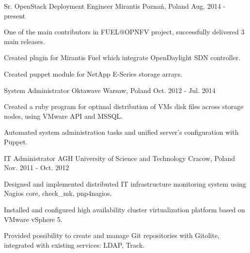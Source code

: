 

\begin{cventries}

  \cventry
    {Sr. OpenStack Deployment Engineer} %
    {Mirantis} %
    {Poznań, Poland} %
    {Aug. 2014 - present} %
    {
      \begin{cvitems} %
        \item {One of the main contributors in FUEL@OPNFV project, successfully delivered 3 main releases.}
        \item {Created plugin for Mirantis Fuel which integrate OpenDaylight SDN controller.}
        \item {Created puppet module for NetApp E-Series storage arrays.}
      \end{cvitems}
    }

  \cventry
    {System Administrator} %
    {Oktawave} %
    {Warsaw, Poland} %
    {Oct. 2012 - Jul. 2014} %
    {
      \begin{cvitems} %
        \item {Created a ruby program for optimal distribution of VMs disk files across storage nodes, using VMware API and MSSQL.}
        \item {Automated system administration tasks and unified server's configuration with Puppet.}
      \end{cvitems}
    }

  \cventry
    {IT Administrator} %
    {AGH University of Science and Technology} %
    {Cracow, Poland} %
    {Nov. 2011 - Oct. 2012} %
    {
      \begin{cvitems} %
        \item {Designed and implemented distributed IT infrastructure monitoring system using Nagios core, check\_mk, pnp4nagios.}
        \item {Installed and configured high availability cluster virtualization platform based on VMware vSphere 5.}
        \item {Provided possibility to create and manage Git repositories with Gitolite, integrated with existing services: LDAP, Track.}
      \end{cvitems}
    }


\end{cventries}

